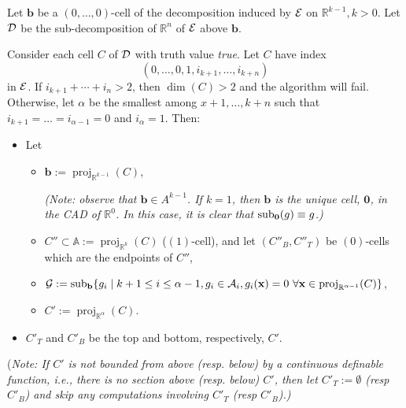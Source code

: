 \documentclass[
]{book}
\theoremstyle{definition}
\theoremstyle{definition}
\theoremstyle{definition}
\theoremstyle{definition}
\theoremstyle{remark}
\begin{document}
Let \(\mathbf{b}\) be a \((0,\ldots,0)\)-cell of the decomposition induced by \(\cal E\) on \(\mathbb{R}^{k-1}, k > 0\). Let \(\cal D\) be the sub-decomposition of \(\mathbb{R}^n\) of \(\cal E\) above \(\mathbf{b}\).

Consider each cell \(C\) of \(\cal D\) with truth value \emph{true}. Let \(C\) have index
\[
(0,\ldots,0,1,i_{k+1},\ldots,i_{k+n})
\]
in \(\cal E\). If \(i_{k+1} + \cdots + i_n > 2\), then \(\dim(C) > 2\) and the algorithm will fail. Otherwise, let \(\alpha\) be the smallest among \(x+1,\ldots,k+n\) such that \(i_{k+1} = \ldots = i_{\alpha - 1} = 0\) and \(i_\alpha = 1\).
Then:

\begin{itemize}
\item
  Let

  \begin{itemize}
  \item
    \(\mathbf{b} := {\operatorname{proj}_{\mathbb{R}^{k-1}}}(C)\),

    \emph{(Note: observe that \(\mathbf{b} \in A^{k-1}\). If \(k = 1\), then \(\mathbf{b}\) is the unique cell, \(\mathbf{0}\), in the CAD of \(\mathbb{R}^0\). In this case, it is clear that \({\rm sub}_\mathbf{0} (g) \equiv g\).)}
  \item
    \(C'' \subset \mathbb{A}:= {\operatorname{proj}_{\mathbb{R}^{k}}}(C)\) (\((1)\)-cell), and let \((C''_B, C''_T)\) be \((0)\)-cells which are the endpoints of \(C''\),
  \item
    \({\cal G} := {\rm sub}_{\mathbf{b}} \{ g_i \mid k+1 \le i \le \alpha - 1, g_i \in {\cal A}_i, g_i(\mathbf{x}) = 0 \ \forall \mathbf{x} \in {\operatorname{proj}_{\mathbb{R}^{\alpha-1}}}(C) \}\),
  \item
    \(C' := {\operatorname{proj}_{\mathbb{R}^{\alpha}}}(C)\).
  \end{itemize}
\item
  \(C'_T\) and \(C'_B\) be the top and bottom, respectively, \(C'\).
\end{itemize}

(\emph{Note: If \(C'\) is not bounded from above (resp. below) by a continuous definable function, i.e., there is no section above (resp. below) \(C'\), then let \(C'_T := \emptyset\) (resp \(C'_B\)) and skip any computations involving \(C'_T\) (resp \(C'_B\)).)}
\end{document}
